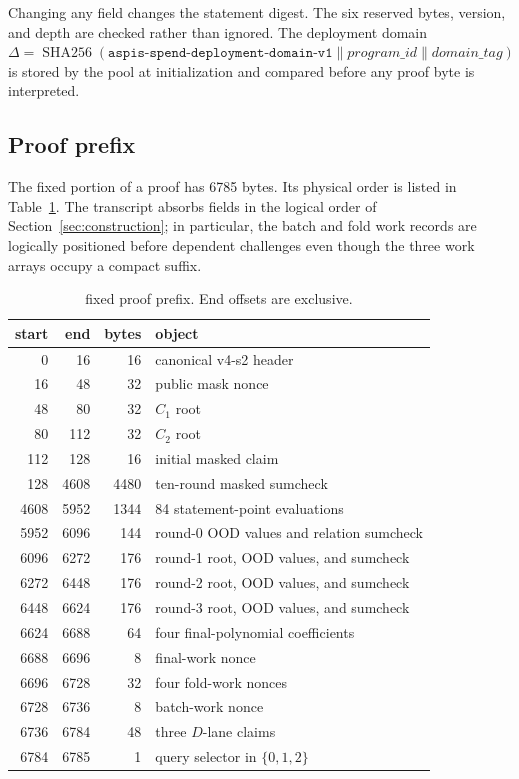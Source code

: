 Changing any field changes the statement digest.  The six reserved bytes,
version, and depth are checked rather than ignored.  The deployment domain
\(\Delta = \operatorname{SHA256}(\texttt{aspis-spend-deployment-domain-v1}\|
\mathit{program\_id}\|\mathit{domain\_tag})\) is stored by the pool at
initialization and compared before any proof byte is interpreted.

\subsection{Proof prefix}

The fixed portion of a \Profile{} proof has 6785 bytes.  Its physical order
is listed in Table~\ref{tab:proof-prefix-wire}.  The transcript absorbs fields
in the logical order of Section~\ref{sec:construction}; in particular, the
batch and fold work records are logically positioned before dependent
challenges even though the three work arrays occupy a compact suffix.

\begin{table}[ht]
\centering
\small
\caption{\Profile{} fixed proof prefix.  End offsets are exclusive.}
\label{tab:proof-prefix-wire}
\begin{tabular}{@{}rrrl@{}}
\toprule
start & end & bytes & object \\
\midrule
0 & 16 & 16 & canonical v4-s2 header \\
16 & 48 & 32 & public mask nonce \\
48 & 80 & 32 & \(C_1\) root \\
80 & 112 & 32 & \(C_2\) root \\
112 & 128 & 16 & initial masked claim \\
128 & 4608 & 4480 & ten-round masked sumcheck \\
4608 & 5952 & 1344 & 84 statement-point evaluations \\
5952 & 6096 & 144 & round-0 OOD values and relation sumcheck \\
6096 & 6272 & 176 & round-1 root, OOD values, and sumcheck \\
6272 & 6448 & 176 & round-2 root, OOD values, and sumcheck \\
6448 & 6624 & 176 & round-3 root, OOD values, and sumcheck \\
6624 & 6688 & 64 & four final-polynomial coefficients \\
6688 & 6696 & 8 & final-work nonce \\
6696 & 6728 & 32 & four fold-work nonces \\
6728 & 6736 & 8 & batch-work nonce \\
6736 & 6784 & 48 & three \(D\)-lane claims \\
6784 & 6785 & 1 & query selector in \(\{0,1,2\}\) \\
\bottomrule
\end{tabular}
\end{table}

